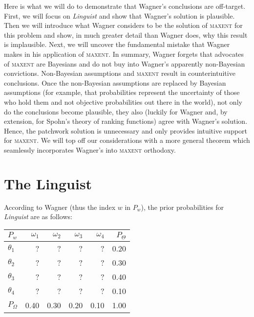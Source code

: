 \documentclass[11pt]{article}
\begin{document}
Here is what we will do to demonstrate that Wagner's conclusions are
off-target. First, we will focus on \emph{Linguist} and show that
Wagner's solution is plausible. Then we will introduce what Wagner
considers to be the solution of \textsc{maxent} for this problem and
show, in much greater detail than Wagner does, why this result is
implausible. Next, we will uncover the fundamental mistake that Wagner
makes in his application of \textsc{maxent}. In summary, Wagner
forgets that advocates of \textsc{maxent} are Bayesians and do not buy
into Wagner's apparently non-Bayesian convictions. Non-Bayesian
assumptions and \textsc{maxent} result in counterintuitive
conclusions. Once the non-Bayesian assumptions are replaced by
Bayesian assumptions (for example, that probabilities represent the
uncertainty of those who hold them and not objective probabilities out
there in the world), not only do the conclusions become plausible,
they also (luckily for Wagner and, by extension, for Spohn's theory of
ranking functions) agree with Wagner's solution. Hence, the patchwork
solution is unnecessary and only provides intuitive support for
\textsc{maxent}. We will top off our considerations with a more
general theorem which seamlessly incorporates Wagner's 
 into \textsc{maxent} orthodoxy.

\section{The Linguist}
\label{TheLinguist}

According to Wagner (thus the index $w$ in $P_{w}$), the prior
probabilities for \emph{Linguist} are as follows:

\medskip

\begin{tabular}{|l|r|r|r|r|r|}\hline
  $P_{w}$ & $\omega_{1}$ & $\omega_{2}$ & $\omega_{3}$ & $\omega_{4}$ & $P_{\Theta}$ \\ \hline
$\theta_{1}$ & ? & ? & ? & ? & 0.20 \\ \hline
$\theta_{2}$ & ? & ? & ? & ? & 0.30 \\ \hline
$\theta_{3}$ & ? & ? & ? & ? & 0.40 \\ \hline
$\theta_{4}$ & ? & ? & ? & ? & 0.10 \\ \hline
$P_{\Omega}$ & 0.40 & 0.30 & 0.20 & 0.10 & 1.00\\ \hline
\end{tabular}
\end{document}
